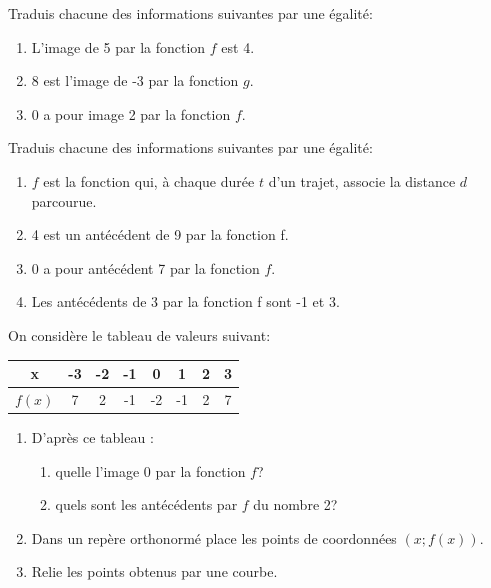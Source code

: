 \documentclass[nocrop]{sesamanuel}
\begin{document}
\begin{colonne*exercice}
\begin{exercice}
Traduis chacune des informations suivantes par une égalité:
\begin{enumerate}
\item L'image de 5 par la fonction $f$ est 4.
\item 8 est l'image de -3 par la fonction $g$.
\item 0 a pour image 2 par la fonction $f$.
\end{enumerate}
\end{exercice}

\begin{exercice}
Traduis chacune des informations suivantes par une égalité:
\begin{enumerate}
\item $f$ est la fonction qui, à chaque durée $t$ d'un trajet, associe la distance $d$ parcourue.
\item 4 est un antécédent de 9 par la fonction f.
\item 0 a pour antécédent 7 par la fonction $f$.
\item Les antécédents de 3 par la fonction f sont -1 et 3.
\end{enumerate}
\end{exercice}

\begin{exercice}
On considère le tableau de valeurs suivant:\\
\begin{tabular}{|c|c|c|c|c|c|c|c|}
\hline 
x & -3 & -2 & -1 & 0 & 1 & 2 & 3 \\ 
\hline 
$f(x)$ & 7 & 2 & -1 & -2 & -1 & 2 & 7 \\ 
\hline 
\end{tabular} 
\begin{enumerate}
\item D'après ce tableau : 
\begin{enumerate}
\item quelle l'image 0 par la fonction $f$?
\item quels sont les antécédents par $f$ du nombre 2?
\end{enumerate} 
\item Dans un repère orthonormé place les points de coordonnées $(x;f(x))$.
\item Relie les points obtenus par une courbe.
\end{enumerate}
\end{exercice}


\end{colonne*exercice}
\end{document}
